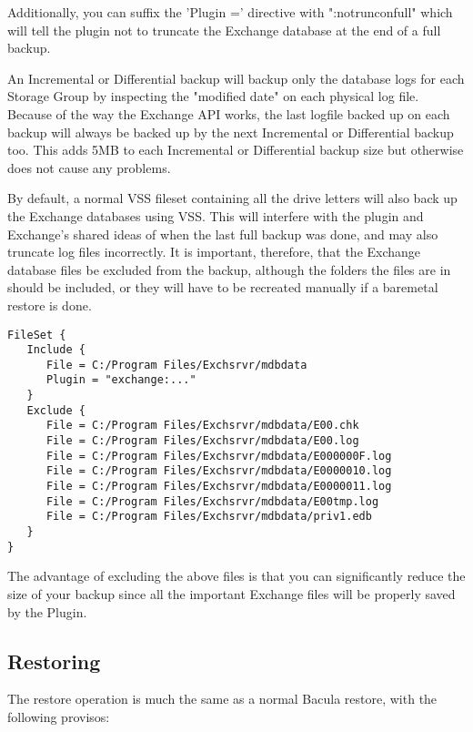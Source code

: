 Additionally, you can suffix the 'Plugin =' directive with
":notrunconfull" which will tell the plugin not to truncate the Exchange
database at the end of a full backup.

An Incremental or Differential backup will backup only the database logs
for each Storage Group by inspecting the "modified date" on each
physical log file. Because of the way the Exchange API works, the last
logfile backed up on each backup will always be backed up by the next
Incremental or Differential backup too. This adds 5MB to each
Incremental or Differential backup size but otherwise does not cause any
problems.

By default, a normal VSS fileset containing all the drive letters will
also back up the Exchange databases using VSS. This will interfere with
the plugin and Exchange's shared ideas of when the last full backup was
done, and may also truncate log files incorrectly. It is important,
therefore, that the Exchange database files be excluded from the backup,
although the folders the files are in should be included, or they will
have to be recreated manually if a baremetal restore is done.

\begin{verbatim}
FileSet {
   Include {
      File = C:/Program Files/Exchsrvr/mdbdata
      Plugin = "exchange:..."
   }
   Exclude {
      File = C:/Program Files/Exchsrvr/mdbdata/E00.chk
      File = C:/Program Files/Exchsrvr/mdbdata/E00.log
      File = C:/Program Files/Exchsrvr/mdbdata/E000000F.log
      File = C:/Program Files/Exchsrvr/mdbdata/E0000010.log
      File = C:/Program Files/Exchsrvr/mdbdata/E0000011.log
      File = C:/Program Files/Exchsrvr/mdbdata/E00tmp.log
      File = C:/Program Files/Exchsrvr/mdbdata/priv1.edb
   }
}
\end{verbatim}

The advantage of excluding the above files is that you can significantly
reduce the size of your backup since all the important Exchange files
will be properly saved by the Plugin.


\subsection{Restoring}
The restore operation is much the same as a normal Bacula restore, with
the following provisos:

